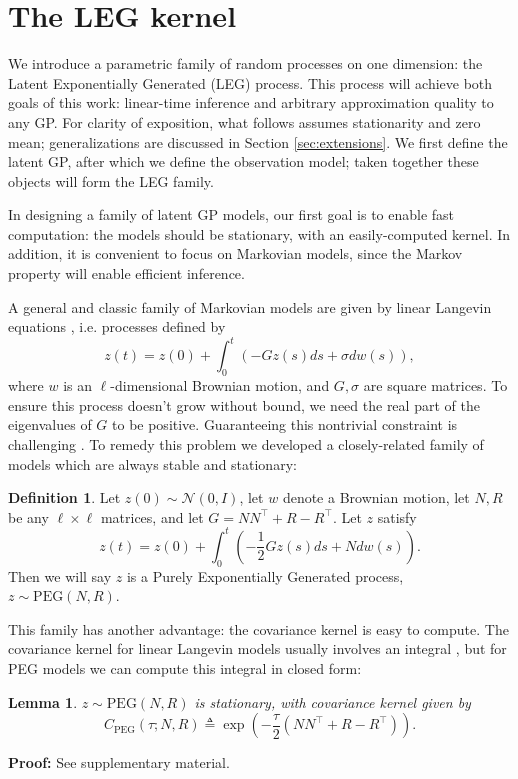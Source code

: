 \documentclass{article}
\newtheorem{lemma}{Lemma}
\theoremstyle{definition}
\newtheorem{definition}{Definition}
\newcommand{\diffusion}{N}
\newcommand{\rotparm}{R}
\newcommand{\latV}{z}
\newcommand{\PEG}{\mathrm{PEG}}
\newcommand{\PEGGP}{\mathrm{PEG}}
\begin{document}
\section{The LEG kernel}

We introduce a parametric family of random processes on one dimension: the Latent Exponentially Generated (LEG) process. This process will achieve both goals of this work: linear-time inference and arbitrary approximation quality to any GP. For clarity of exposition, what follows assumes stationarity and zero mean; generalizations are discussed in Section \ref{sec:extensions}.  We first define the latent GP, after which we define the observation model; taken together these objects will form the LEG family.

In designing a family of latent GP models, 
our first goal is to enable fast computation:
the models should be stationary, with an easily-computed kernel.  In addition, it is convenient to focus on Markovian models, since the Markov property will enable efficient inference.

A general and classic family of Markovian models are given by linear Langevin equations \cite{coffey2004langevin}, i.e. processes defined by 
\[
z(t) = z(0) + \int_0^t (-G z(s) ds + \sigma dw(s)),
\]
where $w$ is an $\ell$-dimensional Brownian motion, and $G,\sigma$ are square matrices.  To ensure this process doesn't grow without bound, we need the real part of the eigenvalues of $G$ to be positive.  Guaranteeing this nontrivial constraint is challenging \cite{buesing2012learning,Gillis2019}.  To remedy this problem we developed a closely-related family of models which are always stable and stationary:

\begin{definition} Let $\latV(0) \sim \mathcal{N}(0,I)$, let $w$ denote a Brownian motion, let $\diffusion,\rotparm$ be any $\ell\times \ell$ matrices, and let $G=\diffusion \diffusion^\top + \rotparm-\rotparm^\top$.  Let $\latV$ satisfy
\[
\latV(t) = \latV(0) + \int_0^t\left(-\frac{1}{2}G \latV(s)ds + N dw(s)\right).
\]
Then we will say $z$ is a Purely Exponentially Generated process, $z \sim \PEGGP(\diffusion,\rotparm)$.
\end{definition}

This family has another advantage: the covariance kernel is easy to compute.  The covariance kernel for linear Langevin models usually involves an integral \cite{vatiwutipong2019alternative}, but for PEG models we can compute this 
integral in closed form:
\begin{lemma} $z \sim \PEGGP(\diffusion,\rotparm)$ is stationary, with covariance kernel given by
\[
C_{\PEG}(\tau;\diffusion,\rotparm)  \triangleq
\exp\left(-\frac{\tau}{2}\left(\diffusion \diffusion^\top + \rotparm-\rotparm^\top\right)\right).
\]
\end{lemma}
{\bf Proof:} See supplementary material.  
\end{document}
